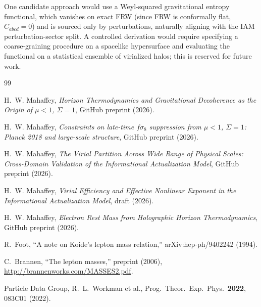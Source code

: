 \documentclass[12pt,a4paper]{article}
\begin{document}
One candidate approach would use a Weyl-squared gravitational entropy functional, which vanishes on exact FRW (since FRW is conformally flat, $C_{abcd}=0$) and is sourced only by perturbations, naturally aligning with the IAM perturbation-sector split.
A controlled derivation would require specifying a coarse-graining procedure on a spacelike hypersurface and evaluating the functional on a statistical ensemble of virialized halos; this is reserved for future work.


\begin{thebibliography}{99}

H.~W. Mahaffey, \emph{Horizon Thermodynamics and Gravitational Decoherence
as the Origin of $\mu<1$, $\Sigma=1$}, GitHub preprint (2026).

H.~W. Mahaffey, \emph{Constraints on late-time $f\sigma_8$ suppression from $\mu<1$, $\Sigma=1$: Planck 2018 and large-scale structure}, GitHub preprint (2026).

H.~W. Mahaffey, \emph{The Virial Partition Across Wide Range of
Physical Scales: Cross-Domain Validation of the
Informational Actualization Model}, GitHub preprint (2026).

H.~W. Mahaffey, \emph{Virial Efficiency and Effective Nonlinear Exponent in the Informational Actualization Model}, draft (2026).

H.~W. Mahaffey, \emph{Electron Rest Mass from Holographic Horizon Thermodynamics}, GitHub preprint (2026).

R.~Foot, ``A note on Koide's lepton mass relation,'' arXiv:hep-ph/9402242 (1994).

C.~Brannen, ``The lepton masses,'' preprint (2006),
\url{http://brannenworks.com/MASSES2.pdf}.

Particle Data Group, R.~L.~Workman et al., Prog.\ Theor.\ Exp.\ Phys.\ \textbf{2022}, 083C01 (2022).

\end{thebibliography}
\end{document}
